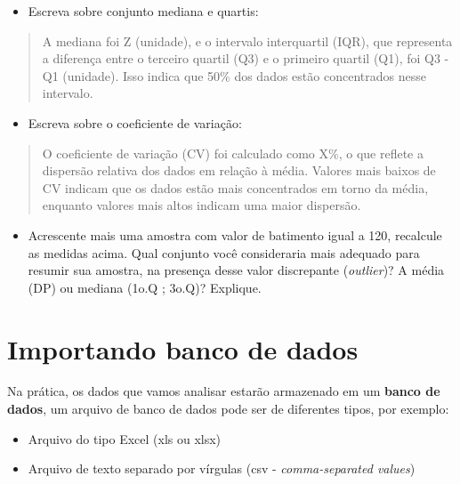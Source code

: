 \documentclass[
]{book}
\providecommand{\tightlist}{%
  \setlength{\itemsep}{0pt}\setlength{\parskip}{0pt}}
\begin{document}
\begin{itemize}
\tightlist
\item
  Escreva sobre conjunto mediana e quartis:
\end{itemize}

\begin{quote}
A mediana foi Z (unidade), e o intervalo interquartil (IQR), que representa a diferença entre o terceiro quartil (Q3) e o primeiro quartil (Q1), foi Q3 - Q1 (unidade). Isso indica que 50\% dos dados estão concentrados nesse intervalo.
\end{quote}

\begin{itemize}
\tightlist
\item
  Escreva sobre o coeficiente de variação:
\end{itemize}

\begin{quote}
O coeficiente de variação (CV) foi calculado como X\%, o que reflete a dispersão relativa dos dados em relação à média. Valores mais baixos de CV indicam que os dados estão mais concentrados em torno da média, enquanto valores mais altos indicam uma maior dispersão.
\end{quote}

\begin{itemize}
\tightlist
\item
  Acrescente mais uma amostra com valor de batimento igual a 120, recalcule as medidas acima. Qual conjunto você consideraria mais adequado para resumir sua amostra, na presença desse valor discrepante (\emph{outlier})? A média (DP) ou mediana (1o.Q ; 3o.Q)? Explique.
\end{itemize}

\chapter{Importando banco de dados}\label{importando-banco-de-dados}

Na prática, os dados que vamos analisar estarão armazenado em um \textbf{banco de dados}, um arquivo de banco de dados pode ser de diferentes tipos, por exemplo:

\begin{itemize}
\item
  Arquivo do tipo Excel (xls ou xlsx)
\item
  Arquivo de texto separado por vírgulas (csv - \emph{comma-separated values})
\end{itemize}
\end{document}
